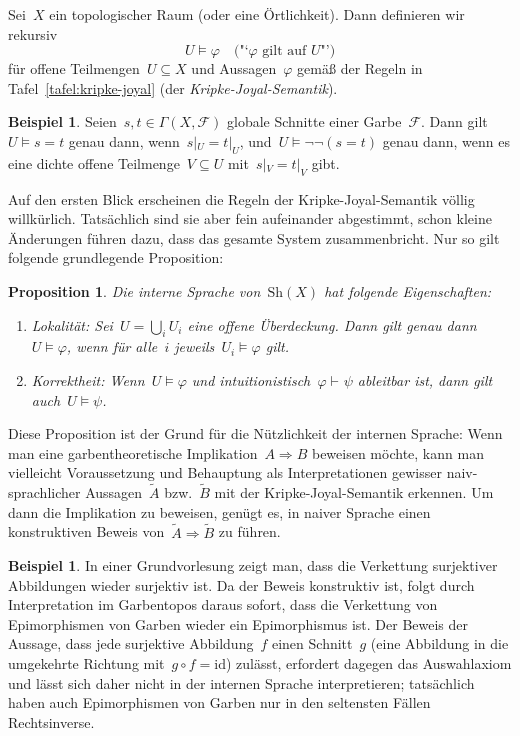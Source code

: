 \documentclass[a4paper,ngerman,12pt]{scrartcl}
\theoremstyle{definition}
\newtheorem{bsp}[defn]{Beispiel}
\theoremstyle{plain}
\newtheorem{prop}[defn]{Proposition}
\theoremstyle{remark}
\newcommand{\F}{\mathcal{F}}
\newcommand{\Sh}{\mathrm{Sh}}
\newcommand{\id}{\mathrm{id}}
\newcommand{\seq}[1]{\mathrel{\vdash\!\!\!_{#1}}}
\renewcommand{\_}{\mathpunct{.}\,}
\newcommand{\?}{\,{:}\,}
\begin{document}
\label{internesprache}%
Sei~$X$ ein topologischer Raum (oder eine Örtlichkeit). Dann definieren wir rekursiv
\[ U \models \varphi \quad \text{("`$\varphi$ gilt auf~$U$"')} \]
für offene Teilmengen~$U \subseteq X$ und Aussagen~$\varphi$ gemäß
der Regeln in Tafel~\ref{tafel:kripke-joyal} (der
\emph{Kripke-Joyal-Semantik}).

\begin{bsp}Seien~$s,t \in \Gamma(X, \F)$ globale Schnitte einer Garbe~$\F$.
Dann gilt~$U \models s = t$ genau dann, wenn~$s|_U = t|_U$, und~$U \models
\neg\neg(s = t)$ genau dann, wenn es eine dichte offene Teilmenge~$V \subseteq
U$ mit~$s|_V = t|_V$ gibt.\end{bsp}

Auf den ersten Blick erscheinen die Regeln der Kripke-Joyal-Semantik völlig
willkürlich. Tatsächlich sind sie aber fein aufeinander abgestimmt, schon
kleine Änderungen führen dazu, dass das gesamte System zusammenbricht. Nur so
gilt folgende grundlegende Proposition:

\begin{prop}
Die interne Sprache von~$\Sh(X)$ hat folgende Eigenschaften:
\begin{enumerate}
\item \emph{Lokalität:} Sei~$U = \bigcup_i U_i$ eine offene Überdeckung. Dann
gilt genau dann~$U \models \varphi$, wenn für alle~$i$ jeweils~$U_i \models
\varphi$ gilt.
\item \emph{Korrektheit:} Wenn~$U \models \varphi$ und
intuitionistisch~$\varphi \seq{} \psi$ ableitbar ist, dann gilt auch~$U \models
\psi$.
\end{enumerate}
\end{prop}

Diese Proposition ist der Grund für die Nützlichkeit der internen Sprache: Wenn
man eine garbentheoretische Implikation~$A \Rightarrow B$ beweisen möchte, kann man vielleicht
Voraussetzung und Behauptung als Interpretationen gewisser naiv-sprachlicher
Aussagen~$\tilde A$ bzw.~$\tilde B$ mit der Kripke-Joyal-Semantik erkennen. Um
dann die Implikation zu beweisen, genügt es, in naiver Sprache einen
konstruktiven Beweis von~$\tilde A \Rightarrow \tilde B$ zu führen.

\begin{bsp}In einer Grundvorlesung zeigt man, dass die Verkettung surjektiver
Abbildungen wieder surjektiv ist. Da der Beweis konstruktiv ist, folgt durch
Interpretation im Garbentopos daraus sofort, dass die Verkettung von
Epimorphismen von Garben wieder ein Epimorphismus ist. Der Beweis der Aussage, dass jede
surjektive Abbildung~$f$ einen Schnitt~$g$ (eine Abbildung in die umgekehrte
Richtung mit~$g \circ f = \id$) zulässt, erfordert dagegen das Auswahlaxiom und
lässt sich daher nicht in der internen Sprache interpretieren; tatsächlich
haben auch Epimorphismen von Garben nur in den seltensten Fällen Rechtsinverse.\end{bsp}
\end{document}
